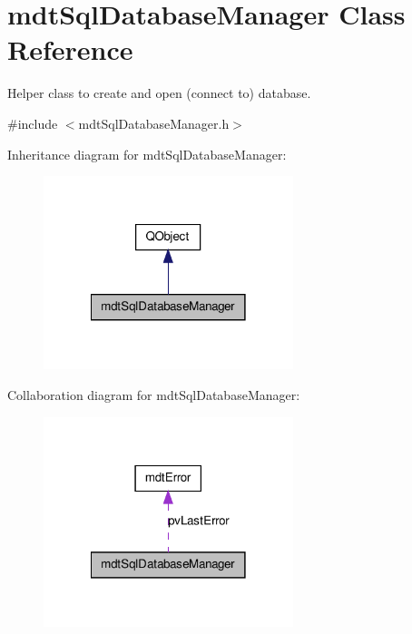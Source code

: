 \hypertarget{classmdt_sql_database_manager}{\section{mdt\-Sql\-Database\-Manager Class Reference}
\label{classmdt_sql_database_manager}
}


Helper class to create and open (connect to) database.  




{\ttfamily \#include $<$mdt\-Sql\-Database\-Manager.\-h$>$}



Inheritance diagram for mdt\-Sql\-Database\-Manager\-:\nopagebreak
\begin{figure}[H]
\begin{center}
\leavevmode
\includegraphics[width=206pt]{classmdt_sql_database_manager__inherit__graph}
\end{center}
\end{figure}


Collaboration diagram for mdt\-Sql\-Database\-Manager\-:\nopagebreak
\begin{figure}[H]
\begin{center}
\leavevmode
\includegraphics[width=206pt]{classmdt_sql_database_manager__coll__graph}
\end{center}
\end{figure}
